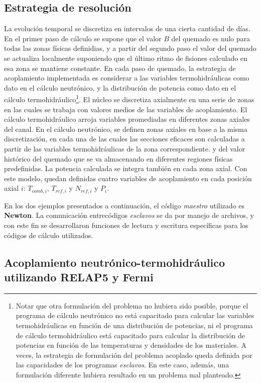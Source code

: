 \subsection*{Estrategia de resolución}
\label{3:modelo-nt}

La evolución temporal se discretiza en intervalos de una cierta cantidad de días.
En el primer paso de cálculo se supone que el valor $B$ del quemado es nulo para todas las zonas físicas definidias,
y a partir del segundo paso el valor del quemado se actualiza localmente suponiendo que el último ritmo de fisiones calculado en esa zona se mantiene constante.
En cada paso de quemado,
la estrategia de acoplamiento implementada es considerar a las variables termohidráulicas como dato en el cálculo neutrónico,
y la distribución de potencia como dato en el cálculo termohidráulico\footnote{
Notar que otra formulación del problema no hubiera sido posible,
porque el programa de cálculo neutrónico no está capacitado para calcular las variables termohidráulicas en función de una distribución de potencias,
ni el programa de cálculo termohidráulico está capacitado para calcular la distribución de potencias en función de las temperaturas y densidades de los materiales.
A veces, la estrategia de formulación del problema acoplado queda definida por las capacidades de los programas \textit{esclavos}.
En este caso, además, una formulación diferente hubiera resultado en un problema mal planteado.
}.
El núcleo se discretiza axialmente en una serie de zonas en las cuales se trabaja con valores medios de las variables de acoplamiento.
El cálculo termohidráulico arroja variables promediadas en diferentes zonas axiales del canal.
En el cálculo neutrónico, se definen zonas axiales en base a la misma discretización,
en cada una de las cuales las secciones eficaces son calculadas a partir de las variables termohidráulicas de la zona correspondiente.
y del valor histórico del quemado que se va almacenando en diferentes regiones físicas predefinidas.
La potencia calculada se integra también en cada zona axial.
Con este modelo, quedan definidas cuatro variables de acoplamiento en cada posición axial $i$: $T_{comb,i}$, $T_{ref,i}$ y $N_{ref,i}$ y $P_i$.

En los dos ejemplos presentados a continuación, el código \textit{maestro} utilizado es \textbf{Newton}.
La comunicación entrecódigos \textit{esclavos} se da por manejo de archivos,
y con este fin se desarrollaron funciones de lectura y escritura específicas para los códigos de cálculo utilizados.

\subsection*{Acoplamiento neutrónico-termohidráulico utilizando \textbf{RELAP5} y \textbf{Fermi}}
\label{3:relap-fermi}

